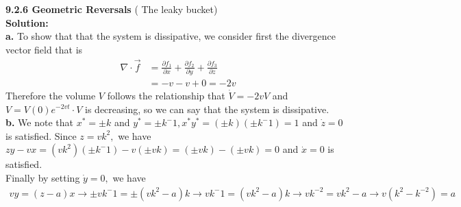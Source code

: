 \documentclass[12pt]{article}
\begin{document}
	\noindent
	{\bf 9.2.6 Geometric Reversals} ( The leaky bucket)\\
	{\bf Solution:}\\
	\indent
	{\bf a. } To show that that the system is dissipative, we consider first the divergence vector field that is
	\begin{align*}
	\nabla \cdot \vec{f} &=\frac{\partial f_1}{\partial x}+\frac{\partial f_2}{\partial y}+\frac{\partial f_3}{\partial z}\\
	&=-v-v+0=-2v
	\end{align*}
	Therefore the volume $V$ follows the relationship that $\dot{V}=-2vV$ and $V=V(0)e^{-2vt} \cdot V$ is decreasing, so we can say that the system is dissipative.\\
	{\bf b. } We note that $x^*=\pm k$ and $y^*=\pm k^-1, x^*y^*=(\pm k)(\pm k^-1)=1$ and $\dot{z}=0$ is satisfied. Since $z=vk^2,$ we have $zy-vx=(vk^2)(\pm k^-1)-v(\pm vk)=(\pm vk)-(\pm vk)=0$ and $\dot{x}=0$ is satisfied.\\
	Finally by setting $\dot{y}=0,$ we have
	\begin{align*}
	vy=(z-a)x \rightarrow \pm vk^-1=\pm (vk^2-a)k \rightarrow vk^-1=(vk^2-a)k \rightarrow vk^{-2}=vk^2-a \rightarrow v(k^2-k^{-2})=a
	\end{align*}
	
\end{document}
